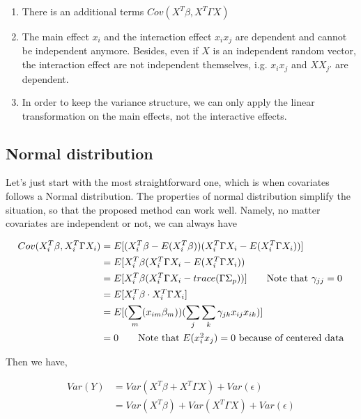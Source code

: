 \documentclass[]{article}
\providecommand{\tightlist}{%
  \setlength{\itemsep}{0pt}\setlength{\parskip}{0pt}}
\begin{document}
\begin{enumerate}
\def\labelenumi{\arabic{enumi}.}
\tightlist
\item
  There is an additional terms \(Cov(X^T\beta, X^T\Gamma X)\)
\item
  The main effect \(x_i\) and the interaction effect \(x_ix_j\) are
  dependent and cannot be independent anymore. Besides, even if \(X\) is
  an independent random vector, the interaction effect are not
  independent themselves, i.g. \(x_i x_j\) and \(X X_{j'}\) are
  dependent.
\item
  In order to keep the variance structure, we can only apply the linear
  transformation on the main effects, not the interactive effects.
\end{enumerate}

\subsection{Normal distribution}\label{normal-distribution}

Let's just start with the most straightforward one, which is when
covariates follows a Normal distribution. The properties of normal
distribution simplify the situation, so that the proposed method can
work well. Namely, no matter covariates are independent or not, we can
always have

\begin{align*}
Cov(X_i^T\beta, X_i^T\Gamma X_i) &= E[(X_i^T\beta - E(X_i^T\beta))(X_i^T\Gamma X_i - E(X_i^T\Gamma X_i))]\\
    &= E[X_i^T\beta(X_i^T\Gamma X_i - E(X_i^T\Gamma X_i)) \\
    &= E[X_i^T\beta(X_i^T\Gamma X_i - trace(\Gamma\Sigma_p))] \tag*{Note that $\gamma_{jj} = 0$}\\
    &= E[X_i^T\beta \cdot X_i^T\Gamma X_i] \\
    &= E[(\sum_m(x_{im}\beta_m))(\sum_j\sum_k\gamma_{jk}x_{ij} x_{ik}) ] \\
    & = 0 \tag*{Note that $E(x_i^2x_j) = 0$ because of centered data}
\end{align*}

Then we have,

\begin{align*}
Var(Y) &= Var(X^T\beta + X^T\Gamma X) + Var(\epsilon) \\
         &= Var(X^T\beta) + Var(X^T\Gamma X) + Var(\epsilon) \\
\end{align*}
\end{document}
